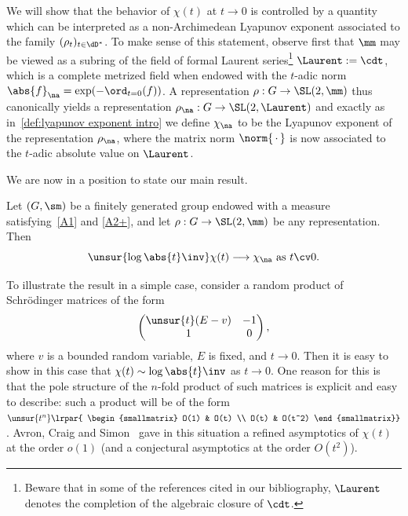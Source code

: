 We will show that the behavior of $\chi(t)$ at $t\to 0$ is controlled by a quantity which can be interpreted as a non-Archimedean Lyapunov exponent associated to the family $(\rho_t)_{t\in \dD^*}$. To make sense of this statement, observe first that $\mm$ may be viewed as a subring of the field of formal Laurent series\footnote{Beware that in some of the references cited in our bibliography, $\Laurent$ denotes the completion of the algebraic closure of $\cdt$.} $\Laurent:=\cdt$, which is a complete metrized field when endowed with the $t$-adic norm $\abs{f}_\na = \exp(-\ord_{t=0}(f))$. A representation $\rho : G \to \SL(2,\mm)$ thus canonically yields a representation $\rho_\na : G \to \SL(2,\Laurent)$ and exactly as in~\eqref{def:lyapunov exponent intro} we define $\chi_\na$ to be the Lyapunov exponent of the representation $\rho_\na$, where the matrix norm $\norm{\,\cdot\,}$ is now associated to the $t$-adic absolute value on $\Laurent$.


We are now in a position to state our main result.

\begin{mthm}\label{Thm:lyapunov na}
Let $(G, \sm)$ be a finitely generated group endowed with a measure satisfying~\eqref{A1} and \eqref{A2+}, and let $\rho: G\to \SL(2, \mm)$ be any representation. Then
\begin{equation}
\label{eq:lyapunov na}
\unsur{{\log\abs{t}\inv}}\chi(t) \longrightarrow \chi_\na \text{ as } t\cv 0.
\end{equation}
\end{mthm}


To illustrate the result in a simple case, consider a random product of Schr\"odinger matrices of the form
\begin{equation}
\label{eq:schrodinger matrix}
\begin{pmatrix} {\unsur{t}(E-v)} & -1 \\ 1 & 0
\end{pmatrix},
\end{equation}
where $v$ is a bounded random variable, $E$ is fixed, and $t\to 0$. Then it is easy to show in this case that $\chi(t)\sim \log\abs{t}\inv$ as $t\to 0$. One reason for this is that the pole structure of the $n$-fold product of such matrices is explicit and easy to describe: such a product will be of the form $\unsur{t^n}\lrpar{
\begin{smallmatrix} O(1) & O(t) \\ O(t) & O(t^2)
\end{smallmatrix}}$.
Avron, Craig and Simon~\cite{avron-craig-simon} gave in this situation a refined asymptotics of $\chi(t)$ at the order $o(1)$ (and a conjectural asymptotics at the order $O(t^{2})$).

